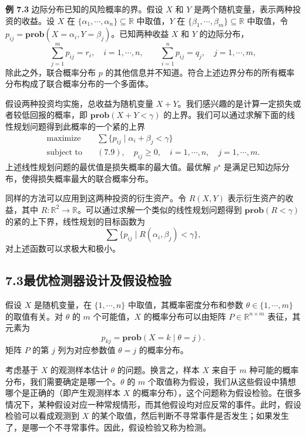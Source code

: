 \documentclass[UTF8,12pt,a4paper,fontset=fandol]{ctexart}
\begin{document}
\noindent\textbf{例 7.3}\quad
边际分布已知的风险概率的界。假设 $X$ 和 $Y$ 是两个随机变量，表示两种投资的收益。设 $X$ 在 $\{\alpha_1,\cdots,\alpha_n\}\subseteq\mathbb{R}$ 中取值，$Y$ 在 $\{\beta_1,\cdots,\beta_m\}\subseteq\mathbb{R}$ 中取值，令 $p_{ij}=\mathbf{prob}(X=\alpha_i,Y=\beta_j)$。已知两种收益 $X$ 和 $Y$ 的边际分布，
\begin{equation}
\sum_{j=1}^m p_{ij}=r_i,\quad i=1,\cdots,n,\qquad
\sum_{i=1}^n p_{ij}=q_j,\quad j=1,\cdots,m,
\tag{7.9}
\end{equation}
除此之外，联合概率分布 $p$ 的其他信息并不知道。符合上述边界分布的所有概率分布构成了联合概率分布的一个多面体。

假设两种投资均实施，总收益为随机变量 $X+Y$。我们感兴趣的是计算一定损失或者较低回报的概率，即 $\mathbf{prob}(X+Y<\gamma)$ 的上界。我们可以通过求解下面的线性规划问题得到此概率的一个紧的上界
\[
\begin{aligned}
\text{maximize}\quad & \sum\{p_{ij}\mid \alpha_i+\beta_j<\gamma\}\\
\text{subject to}\quad & (7.9),\quad p_{ij}\geq 0,\quad i=1,\cdots,n,\quad j=1,\cdots,m.
\end{aligned}
\]
上述线性规划问题的最优值是损失概率的最大值。最优解 $p^\star$ 是满足已知边际分布，使得损失概率最大的联合概率分布。

同样的方法可以应用到这两种投资的衍生资产。令 $R(X,Y)$ 表示衍生资产的收益，其中 $R:\mathbb{R}^2\to\mathbb{R}$。可以通过求解一个类似的线性规划问题得到 $\mathbf{prob}(R<\gamma)$ 的紧的上下界，线性规划的目标函数为
\[
\sum\{p_{ij}\mid R(\alpha_i,\beta_j)<\gamma\},
\]
对上述函数可以求极大和极小。

\subsection*{7.3\quad 最优检测器设计及假设检验}

假设 $X$ 是随机变量，在 $\{1,\cdots,n\}$ 中取值，其概率密度分布和参数 $\theta\in\{1,\cdots,m\}$ 的取值有关。对 $\theta$ 的 $m$ 个可能值，$X$ 的概率分布可以由矩阵 $P\in\mathbb{R}^{n\times m}$ 表征，其元素为
\[
p_{kj}=\mathbf{prob}(X=k\mid \theta=j).
\]
矩阵 $P$ 的第 $j$ 列为对应参数值 $\theta=j$ 的概率分布。

考虑基于 $X$ 的观测样本估计 $\theta$ 的问题。换言之，样本 $X$ 来自于 $m$ 种可能的概率分布，我们需要确定是哪一个。$\theta$ 的 $m$ 个取值称为假设，我们从这些假设中猜想哪个是正确的（即产生观测样本 $X$ 的概率分布），这个问题称为假设检验。在很多情况下，某种假设对应一种常规情形，而其他假设均对应反常的事件。此时，假设检验可以看成观测到 $X$ 的某个取值，然后判断不寻常事件是否发生；如果发生了，是哪一个不寻常事件。因此，假设检验又称为检测。
\end{document}
